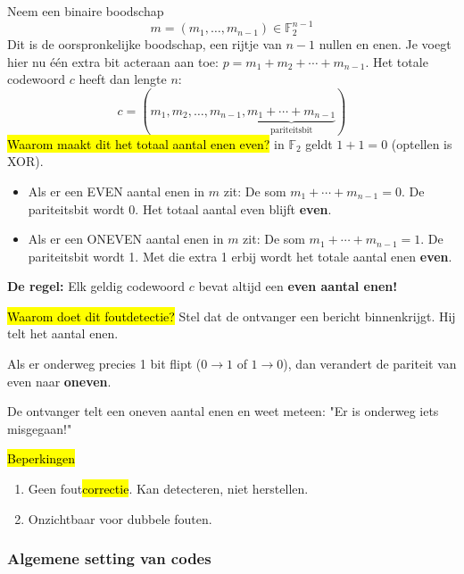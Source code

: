 Neem een binaire boodschap
\begin{equation*}
    m = (m_1, \dots, m_{n-1}) \in \mathbb{F}_2^{n-1}
\end{equation*}
Dit is de oorspronkelijke boodschap, een rijtje van $n-1$ nullen en enen. Je voegt hier nu één extra bit acteraan aan toe: $p = m_1 + m_2 + \cdots + m_{n-1}$. Het totale codewoord $c$ heeft dan lengte $n$:
\begin{equation*}
    c = (m_1, m_2, \dots, m_{n-1}, \underbrace{m_1 + \cdots + m_{n-1}}_{\text{pariteitsbit}})
\end{equation*}
\hl{Waarom maakt dit het totaal aantal enen even?}\newline
in $\mathbb{F}_2$ geldt $1+1=0$ (optellen is XOR).
\begin{itemize}
    \item Als er een EVEN aantal enen in $m$ zit:\newline
    De som $m_1 + \cdots + m_{n-1} = 0$. De pariteitsbit wordt 0. Het totaal aantal even blijft \textbf{even}.
    \item Als er een ONEVEN aantal enen in $m$ zit:\newline
    De som $m_1 + \cdots + m_{n-1} = 1$. De pariteitsbit wordt 1. Met die extra 1 erbij wordt het totale aantal enen \textbf{even}.
\end{itemize}
\textbf{De regel:} Elk geldig codewoord $c$ bevat altijd een \textbf{even aantal enen!}

\hl{Waarom doet dit foutdetectie?}\newline
Stel dat de ontvanger een bericht binnenkrijgt. Hij telt het aantal enen.

Als er onderweg precies 1 bit flipt ($0\to1$ of $1\to0$), dan verandert de pariteit van even naar \textbf{oneven}.

De ontvanger telt een oneven aantal enen en weet meteen: "Er is onderweg iets misgegaan!"

\hl{Beperkingen}
\begin{enumerate}
    \item Geen fout\hl{correctie}. Kan detecteren, niet herstellen.
    \item Onzichtbaar voor dubbele fouten.
\end{enumerate}


\subsubsection{Algemene setting van codes}

